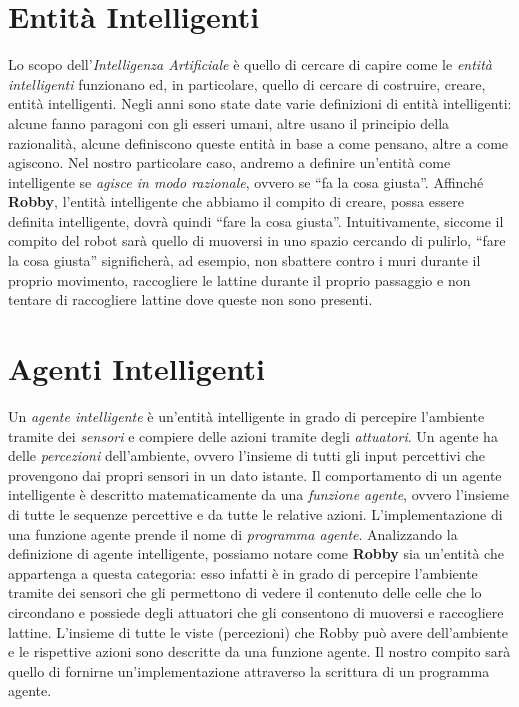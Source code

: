 \section{Entità Intelligenti}
Lo scopo dell'\textit{Intelligenza Artificiale} è quello di cercare di capire
come le \textit{entità intelligenti} funzionano ed, in particolare, quello di
cercare di costruire, creare, entità intelligenti.\newline
Negli anni sono state date varie definizioni di entità intelligenti: alcune
fanno paragoni con gli esseri umani, altre usano il principio della razionalità,
alcune definiscono queste entità in base a come pensano, altre a come agiscono.
Nel nostro particolare caso, andremo a definire un'entità come intelligente se
\textit{agisce in modo razionale}, ovvero se ``fa la cosa giusta''.\newline
Affinché \textbf{Robby}, l'entità intelligente che abbiamo il compito di
creare, possa essere definita intelligente, dovrà quindi ``fare la cosa
giusta''. Intuitivamente, siccome il compito del robot sarà quello di muoversi
in uno spazio cercando di pulirlo, ``fare la cosa giusta'' significherà, ad
esempio, non sbattere contro i muri durante il proprio movimento, raccogliere le
lattine durante il proprio passaggio e non tentare di raccogliere lattine dove
queste non sono presenti.



\section{Agenti Intelligenti}
Un \textit{agente intelligente} è un'entità intelligente in grado di percepire
l'ambiente tramite dei \textit{sensori} e compiere delle azioni tramite degli
\textit{attuatori}.\newline
Un agente ha delle \textit{percezioni} dell'ambiente, ovvero l'insieme di tutti
gli input percettivi che provengono dai propri sensori in un dato
istante.\newline
Il comportamento di un agente intelligente è descritto matematicamente da una
\textit{funzione agente}, ovvero l'insieme di tutte le sequenze percettive
e da tutte le relative azioni. L'implementazione di una funzione agente prende
il nome di \textit{programma agente}.\newline
Analizzando la definizione di agente intelligente, possiamo notare come
\textbf{Robby} sia un'entità che appartenga a questa categoria: esso infatti
è in grado di percepire l'ambiente tramite dei sensori che gli permettono di
vedere il contenuto delle celle che lo circondano e possiede degli attuatori che
gli consentono di muoversi e raccogliere lattine.\newline
L'insieme di tutte le viste (percezioni) che Robby può avere dell'ambiente e le
rispettive azioni sono descritte da una funzione agente. Il nostro compito sarà
quello di fornirne un'implementazione attraverso la scrittura di un programma
agente.



